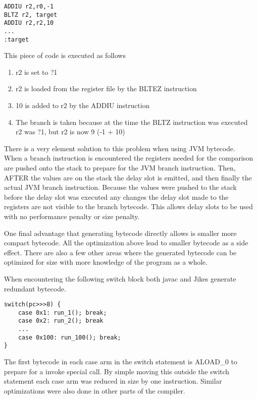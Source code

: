\documentclass{acmconf}
\begin{document}
{\footnotesize\begin{verbatim}
ADDIU r2,r0,-1
BLTZ r2, target
ADDIU r2,r2,10
...
:target
\end{verbatim}}

This piece of code is executed as follows

\begin{enumerate}

\item r2 is set to ?1

\item r2 is loaded from the register file by the BLTEZ instruction
      
\item 10 is added to r2 by the ADDIU instruction

\item The branch is taken because at the time the BLTZ instruction was
      executed r2 was ?1, but r2 is now 9 (-1 + 10)

\end{enumerate}

There is a very element solution to this problem when using JVM
bytecode. When a branch instruction is encountered the registers
needed for the comparison are pushed onto the stack to prepare for the
JVM branch instruction. Then, AFTER the values are on the stack the
delay slot is emitted, and then finally the actual JVM branch
instruction. Because the values were pushed to the stack before the
delay slot was executed any changes the delay slot made to the
registers are not visible to the branch bytecode. This allows delay
slots to be used with no performance penalty or size penalty.

One final advantage that generating bytecode directly allows is
smaller more compact bytecode. All the optimization above lead to
smaller bytecode as a side effect. There are also a few other areas
where the generated bytecode can be optimized for size with more
knowledge of the program as a whole.

When encountering the following switch block both javac and Jikes
generate redundant bytecode.

{\footnotesize\begin{verbatim}
switch(pc>>>8) {
    case 0x1: run_1(); break;
    case 0x2: run_2(); break
    ...
    case 0x100: run_100(); break;
}
\end{verbatim}}

The first bytecode in each case arm in the switch statement is ALOAD\_0 to
prepare for a invoke special call. By simple moving this outside the switch
statement each case arm was reduced in size by one instruction. Similar
optimizations were also done in other parts of the compiler.
\end{document}
